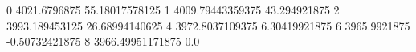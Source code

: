 0 4021.6796875 55.18017578125
1 4009.79443359375 43.294921875
2 3993.189453125 26.68994140625
4 3972.8037109375 6.30419921875
6 3965.9921875 -0.50732421875
8 3966.49951171875 0.0

